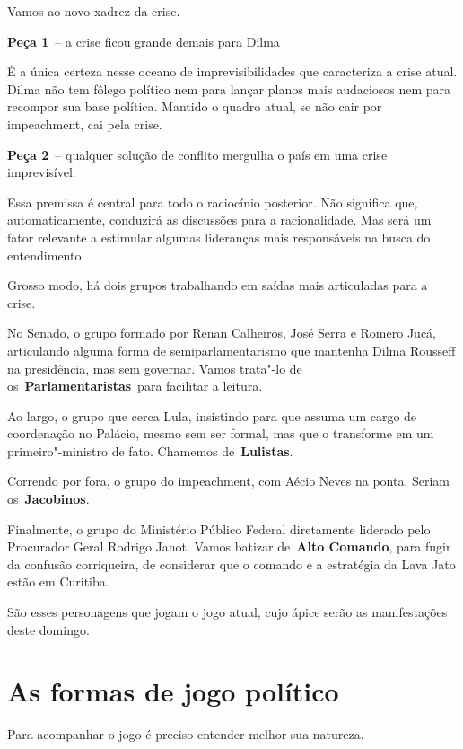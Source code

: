  

Vamos ao novo xadrez da crise.

\textbf{Peça 1}~-- a crise ficou grande demais para Dilma

É a única certeza nesse oceano de imprevisibilidades que caracteriza a
crise atual. Dilma não tem fôlego político nem para lançar planos mais
audaciosos nem para recompor sua base política. Mantido o quadro atual,
se não cair por impeachment, cai pela crise.

\textbf{Peça 2}~-- qualquer solução de conflito mergulha o país em uma
crise imprevisível.

Essa premissa é central para todo o raciocínio posterior. Não significa
que, automaticamente, conduzirá as discussões para a racionalidade. Mas
será um fator relevante a estimular algumas lideranças mais responsáveis
na busca do entendimento.

Grosso modo, há dois grupos trabalhando em saídas mais articuladas para
a crise.

No Senado, o grupo formado por Renan Calheiros, José Serra e Romero
Jucá, articulando alguma forma de semiparlamentarismo que mantenha Dilma
Rousseff na presidência, mas sem governar. Vamos trata"-lo de
os~\textbf{Parlamentaristas}~para facilitar a leitura.

Ao largo, o grupo que cerca Lula, insistindo para que assuma um cargo de
coordenação no Palácio, mesmo sem ser formal, mas que o transforme em um
primeiro"-ministro de fato. Chamemos de~\textbf{Lulistas}.

Correndo por fora, o grupo do impeachment, com Aécio Neves na ponta.
Seriam os~\textbf{Jacobinos}.

Finalmente, o grupo do Ministério Público Federal diretamente liderado
pelo Procurador Geral Rodrigo Janot. Vamos batizar de~\textbf{Alto
Comando}, para fugir da confusão corriqueira, de considerar que o
comando e a estratégia da Lava Jato estão em Curitiba.

São esses personagens que jogam o jogo atual, cujo ápice serão as
manifestações deste domingo.

\section{As formas de jogo político}

Para acompanhar o jogo é preciso entender melhor sua natureza.


